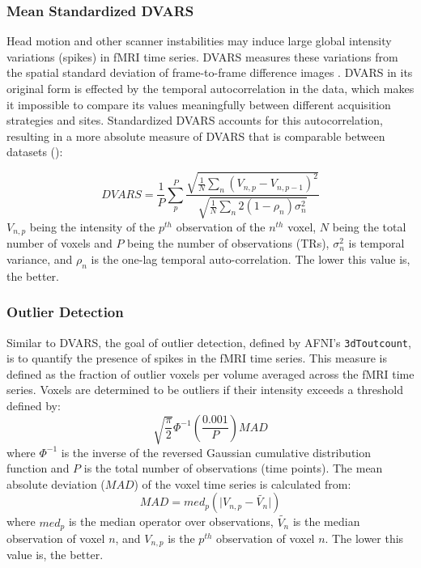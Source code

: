 \documentclass{frontiersSCNS} %
\begin{document}
\subsubsection*{Mean Standardized DVARS}
\label{sec:12}
Head motion and other scanner instabilities may induce large global intensity variations (spikes) in fMRI time series. DVARS measures these variations from the spatial standard deviation of frame-to-frame difference images  \citep{power2012}. DVARS in its original form is effected by the temporal autocorrelation in the data, which makes it impossible to compare its values meaningfully between different acquisition strategies and sites. Standardized DVARS accounts for this autocorrelation, resulting in a more absolute measure of DVARS that is comparable between datasets (\citep{Nichols2013}): 

\begin{equation}
DVARS = \frac{1}{P}\sum_{p}^P{\frac{\sqrt{\frac{1}{N} \sum_{n} (V_{n,p} - V_{n,p - 1})^2}}{\sqrt{\frac{1}{N} \sum_{n} 2(1 - \rho_{n})\sigma_{n}^2}}}
\end{equation}
$V_{n,p}$ being the intensity of the $p^{th}$ observation of the $n^{th}$ voxel, $N$ being the total number of voxels and $P$ being the number of observations (TRs), $\sigma_{n}^2$ is temporal variance, and $\rho_{n}$ is the one-lag temporal auto-correlation.  The lower this value is, the better.

\subsubsection*{Outlier Detection}
\label{sec:13}
Similar to DVARS, the goal of outlier detection, defined by AFNI's \texttt{3dToutcount}, is to quantify the presence of spikes in the fMRI time series. This measure is defined as the fraction of outlier voxels per volume averaged across the fMRI time series. Voxels are determined to be outliers if their intensity exceeds a threshold defined by: 
\begin{equation} \label{outlier_eqn}
\sqrt{\frac{\pi}{2}} \Phi^{-1}\left(\frac{0.001}{P}\right)  MAD
\end{equation}
where $\Phi^{-1}$ is the inverse of the reversed Gaussian cumulative distribution function and $P$ is the total number of observations (time points). The mean absolute deviation ($MAD$) of the voxel time series is calculated from:
\begin{equation} \label{MAD_eqn}
MAD = {med}_p(\lvert V_{n,p} - \widetilde{V_n} \rvert )
\end{equation}
where ${med}_p$ is the median operator over observations, $\widetilde{V_n}$ is the median observation of voxel $n$, and $V_{n,p}$ is the $p^{th}$ observation of voxel ${n}$. The lower this value is, the better.
\end{document}
